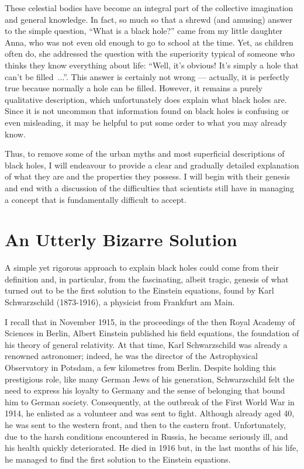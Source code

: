 These celestial bodies have become an integral part of the collective imagination and
general knowledge. In fact, so much so that a shrewd (and amusing) answer to the simple
question, ``What is a black hole?'' came from my little daughter Anna, who was not even
old enough to go to school at the time. Yet, as children often do, she addressed the
question with the superiority typical of someone who thinks they know everything about
life: ``Well, it's obvious! It's simply a hole that can't be filled~...''. This answer
is certainly not wrong --- actually, it is perfectly true because normally a hole can be
filled. However, it remains a purely qualitative description, which unfortunately does
explain what black holes are. Since it is not uncommon that information found on black
holes is confusing or even misleading, it may be helpful to put some order to what you
may already know.

Thus, to remove some of the urban myths and most superficial descriptions of black
holes, I will endeavour to provide a clear and gradually detailed explanation of what
they are and the properties they possess. I will begin with their genesis and end with a
discussion of the difficulties that scientists still have in managing a concept that is
fundamentally difficult to accept.

\section{An Utterly Bizarre Solution}\label{sec:06-solution}

A simple yet rigorous approach to explain black holes could come from their definition
and, in particular, from the fascinating, albeit tragic, genesis of what turned out to
be the first solution to the Einstein equations, found by Karl
Schwarzschild (1873-1916), a physicist from Frankfurt am Main.

I recall that in November 1915, in the proceedings of the then Royal Academy of Sciences
in Berlin, Albert Einstein published his field equations, the foundation of his theory
of general relativity. At that time, Karl Schwarzschild was already a
renowned astronomer; indeed, he was the director of the Astrophysical Observatory in
Potsdam, a few kilometres from Berlin. Despite holding this prestigious role, like many
German Jews of his generation, Schwarzschild felt the need to express his loyalty to
Germany and the sense of belonging that bound him to German society. Consequently, at
the outbreak of the First World War in 1914, he enlisted as a volunteer and was sent to
fight. Although already aged 40, he was sent to the western front, and then to the
eastern front. Unfortunately, due to the harsh conditions encountered in Russia, he
became seriously ill, and his health quickly deteriorated. He died in 1916 but, in the
last months of his life, he managed to find the first solution to the Einstein
equations.

